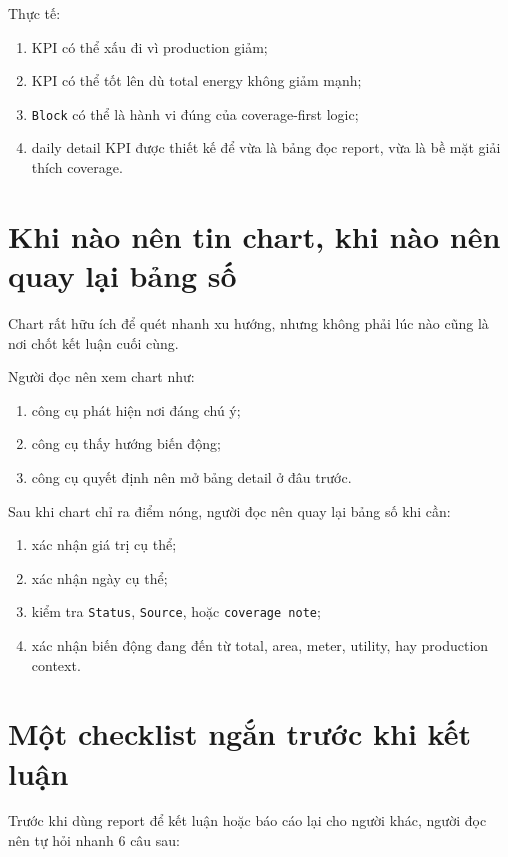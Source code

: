 Thực tế:

\begin{enumerate}[label=-]
\item KPI có thể xấu đi vì production giảm;
\item KPI có thể tốt lên dù total energy không giảm mạnh;
\item \texttt{Block} có thể là hành vi đúng của coverage-first logic;
\item daily detail KPI được thiết kế để vừa là bảng đọc report, vừa là bề mặt giải thích coverage.
\end{enumerate}

\section{Khi nào nên tin chart, khi nào nên quay lại bảng số}

Chart rất hữu ích để quét nhanh xu hướng, nhưng không phải lúc nào cũng là nơi chốt kết luận cuối cùng.

Người đọc nên xem chart như:

\begin{enumerate}[label=-]
\item công cụ phát hiện nơi đáng chú ý;
\item công cụ thấy hướng biến động;
\item công cụ quyết định nên mở bảng detail ở đâu trước.
\end{enumerate}

Sau khi chart chỉ ra điểm nóng, người đọc nên quay lại bảng số khi cần:

\begin{enumerate}[label=-]
\item xác nhận giá trị cụ thể;
\item xác nhận ngày cụ thể;
\item kiểm tra \texttt{Status}, \texttt{Source}, hoặc \texttt{coverage note};
\item xác nhận biến động đang đến từ total, area, meter, utility, hay production context.
\end{enumerate}

\section{Một checklist ngắn trước khi kết luận}

Trước khi dùng report để kết luận hoặc báo cáo lại cho người khác, người đọc nên tự hỏi nhanh 6 câu sau:

